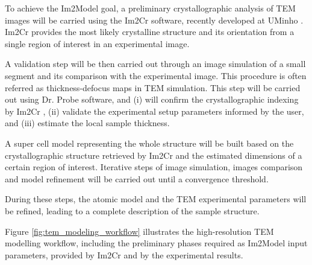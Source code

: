 \documentclass[
  oneside,
  11pt, a4paper,
  footinclude=true,
  headinclude=true,
  cleardoublepage=empty
]{scrbook}
\begin{document}
To achieve the Im2Model goal, a preliminary crystallographic analysis of TEM images will be carried using the Im2Cr software, recently 
developed at UMinho \citep{asilva2016}. Im2Cr provides the most likely crystalline structure and its orientation from a single region of interest in an experimental image. \par 
A validation step will be then carried out through an image simulation of a small segment and its
comparison with the experimental image. This procedure is often referred as thickness-defocus maps in
TEM simulation. This step will be carried out using Dr. Probe \citep{drprobe} 
software, and (i) will confirm the
crystallographic indexing by Im2Cr \citep{asilva2016}, (ii) validate the experimental setup parameters informed by the
user, and (iii) estimate the local sample thickness.\par 
A super cell model representing the whole structure will be built based on the crystallographic structure
retrieved by Im2Cr \citep{asilva2016} and the estimated dimensions of a certain region of interest. Iterative steps of image
simulation, images comparison and model refinement will be carried out until a convergence threshold.\par 
During these steps, the atomic model and the TEM experimental parameters will be refined, leading to a
complete description of the sample structure.\par 



Figure \ref{fig:tem_modeling_workflow} illustrates the high-resolution TEM modelling workflow, including the preliminary phases required as Im2Model input parameters, provided by Im2Cr \citep{asilva2016} and by the experimental results. \par 
\end{document}
